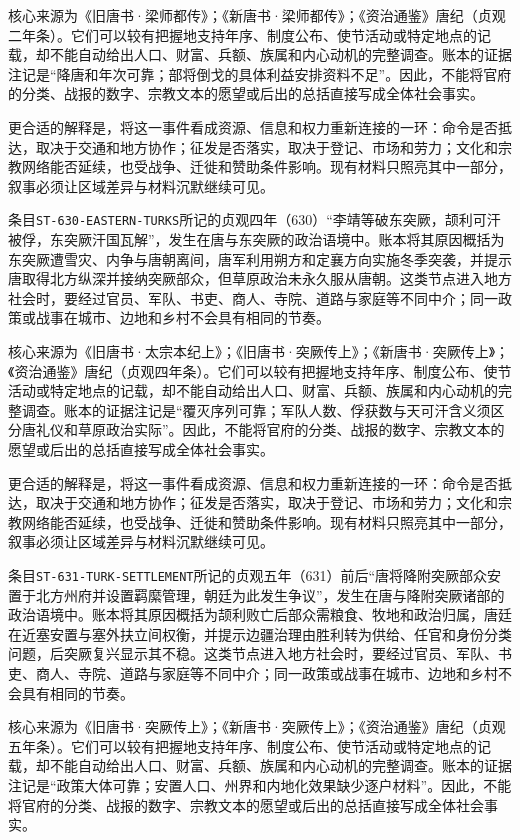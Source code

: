 核心来源为《旧唐书·梁师都传》；《新唐书·梁师都传》；《资治通鉴》唐纪（贞观二年条）。它们可以较有把握地支持年序、制度公布、使节活动或特定地点的记载，却不能自动给出人口、财富、兵额、族属和内心动机的完整调查。账本的证据注记是“降唐和年次可靠；部将倒戈的具体利益安排资料不足”。因此，不能将官府的分类、战报的数字、宗教文本的愿望或后出的总括直接写成全体社会事实。

更合适的解释是，将这一事件看成资源、信息和权力重新连接的一环：命令是否抵达，取决于交通和地方协作；征发是否落实，取决于登记、市场和劳力；文化和宗教网络能否延续，也受战争、迁徙和赞助条件影响。现有材料只照亮其中一部分，叙事必须让区域差异与材料沉默继续可见。


条目\texttt{ST-630-EASTERN-TURKS}所记的贞观四年（630）“李靖等破东突厥，颉利可汗被俘，东突厥汗国瓦解”，发生在唐与东突厥的政治语境中。账本将其原因概括为东突厥遭雪灾、内争与唐朝离间，唐军利用朔方和定襄方向实施冬季突袭，并提示唐取得北方纵深并接纳突厥部众，但草原政治未永久服从唐朝。这类节点进入地方社会时，要经过官员、军队、书吏、商人、寺院、道路与家庭等不同中介；同一政策或战事在城市、边地和乡村不会具有相同的节奏。

核心来源为《旧唐书·太宗本纪上》；《旧唐书·突厥传上》；《新唐书·突厥传上》；《资治通鉴》唐纪（贞观四年条）。它们可以较有把握地支持年序、制度公布、使节活动或特定地点的记载，却不能自动给出人口、财富、兵额、族属和内心动机的完整调查。账本的证据注记是“覆灭序列可靠；军队人数、俘获数与天可汗含义须区分唐礼仪和草原政治实际”。因此，不能将官府的分类、战报的数字、宗教文本的愿望或后出的总括直接写成全体社会事实。

更合适的解释是，将这一事件看成资源、信息和权力重新连接的一环：命令是否抵达，取决于交通和地方协作；征发是否落实，取决于登记、市场和劳力；文化和宗教网络能否延续，也受战争、迁徙和赞助条件影响。现有材料只照亮其中一部分，叙事必须让区域差异与材料沉默继续可见。


条目\texttt{ST-631-TURK-SETTLEMENT}所记的贞观五年（631）前后“唐将降附突厥部众安置于北方州府并设置羁縻管理，朝廷为此发生争议”，发生在唐与降附突厥诸部的政治语境中。账本将其原因概括为颉利败亡后部众需粮食、牧地和政治归属，唐廷在近塞安置与塞外扶立间权衡，并提示边疆治理由胜利转为供给、任官和身份分类问题，后突厥复兴显示其不稳。这类节点进入地方社会时，要经过官员、军队、书吏、商人、寺院、道路与家庭等不同中介；同一政策或战事在城市、边地和乡村不会具有相同的节奏。

核心来源为《旧唐书·突厥传上》；《新唐书·突厥传上》；《资治通鉴》唐纪（贞观五年条）。它们可以较有把握地支持年序、制度公布、使节活动或特定地点的记载，却不能自动给出人口、财富、兵额、族属和内心动机的完整调查。账本的证据注记是“政策大体可靠；安置人口、州界和内地化效果缺少逐户材料”。因此，不能将官府的分类、战报的数字、宗教文本的愿望或后出的总括直接写成全体社会事实。

